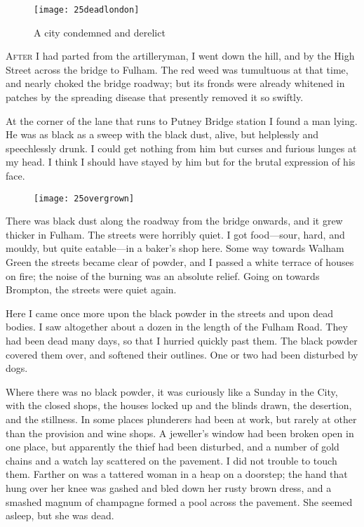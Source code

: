 

\begin{figure}[p]
\centering
\texttt{[image: 25deadlondon]}
\caption{A city condemned and derelict}
\end{figure}

\lettrine[lines=4,findent=2pt]{A}{fter} I had parted from the artilleryman, I went down the hill, and by the High Street across the bridge to Fulham. The red weed was tumultuous at that time, and nearly choked the bridge roadway; but its fronds were already whitened in patches by the spreading disease that presently removed it so swiftly.

At the corner of the lane that runs to Putney Bridge station I found a man lying. He was as black as a sweep with the black dust, alive, but helplessly and speechlessly drunk. I could get nothing from him but curses and furious lunges at my head. I think I should have stayed by him but for the brutal expression of his face.

\begin{figure}[tb!]
\centering
\texttt{[image: 25overgrown]}
\end{figure}

There was black dust along the roadway from the bridge onwards, and it grew thicker in Fulham. The streets were horribly quiet. I got food—sour, hard, and mouldy, but quite eatable—in a baker's shop here. Some way towards Walham Green the streets became clear of powder, and I passed a white terrace of houses on fire; the noise of the burning was an absolute relief. Going on towards Brompton, the streets were quiet again.

Here I came once more upon the black powder in the streets and upon dead bodies. I saw altogether about a dozen in the length of the Fulham Road. They had been dead many days, so that I hurried quickly past them. The black powder covered them over, and softened their outlines. One or two had been disturbed by dogs.



Where there was no black powder, it was curiously like a Sunday in the City, with the closed shops, the houses locked up and the blinds drawn, the desertion, and the stillness. In some places plunderers had been at work, but rarely at other than the provision and wine shops. A jeweller's window had been broken open in one place, but apparently the thief had been disturbed, and a number of gold chains and a watch lay scattered on the pavement. I did not trouble to touch them. Farther on was a tattered woman in a heap on a doorstep; the hand that hung over her knee was gashed and bled down her rusty brown dress, and a smashed magnum of champagne formed a pool across the pavement. She seemed asleep, but she was dead.

